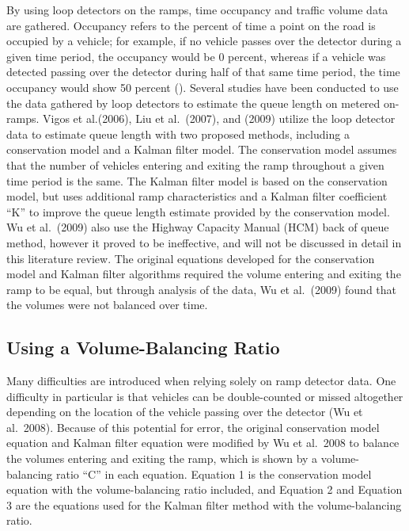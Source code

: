 \documentclass[numbered]{trbarticle}
\begin{document}
By using loop detectors on the ramps, time occupancy and traffic volume data are gathered. Occupancy refers to the percent of time a point on the road is occupied by a vehicle; for example, if no vehicle passes over the detector during a given time period, the occupancy would be 0 percent, whereas if a vehicle was detected passing over the detector during half of that same time period, the time occupancy would show 50 percent (\citet{wu2009experiment}). Several studies have been conducted to use the data gathered by loop detectors to estimate the queue length on metered on-ramps. Vigos et al.(2006), Liu et al.~(2007), and \citet{wu2009experiment} (2009) utilize the loop detector data to estimate queue length with two proposed methods, including a conservation model and a Kalman filter model. The conservation model assumes that the number of vehicles entering and exiting the ramp throughout a given time period is the same. The Kalman filter model is based on the conservation model, but uses additional ramp characteristics and a Kalman filter coefficient ``K'' to improve the queue length estimate provided by the conservation model. Wu et al.~(2009) also use the Highway Capacity Manual (HCM) back of queue method, however it proved to be ineffective, and will not be discussed in detail in this literature review. The original equations developed for the conservation model and Kalman filter algorithms required the volume entering and exiting the ramp to be equal, but through analysis of the data, Wu et al.~(2009) found that the volumes were not balanced over time.

\hypertarget{using-a-volume-balancing-ratio}{%
\subsection{Using a Volume-Balancing Ratio}\label{using-a-volume-balancing-ratio}}

Many difficulties are introduced when relying solely on ramp detector data. One difficulty in particular is that vehicles can be double-counted or missed altogether depending on the location of the vehicle passing over the detector (Wu et al.~2008). Because of this potential for error, the original conservation model equation and Kalman filter equation were modified by Wu et al.~2008 to balance the volumes entering and exiting the ramp, which is shown by a volume-balancing ratio ``C'' in each equation. Equation 1 is the conservation model equation with the volume-balancing ratio included, and Equation 2 and Equation 3 are the equations used for the Kalman filter method with the volume-balancing ratio.
\end{document}
